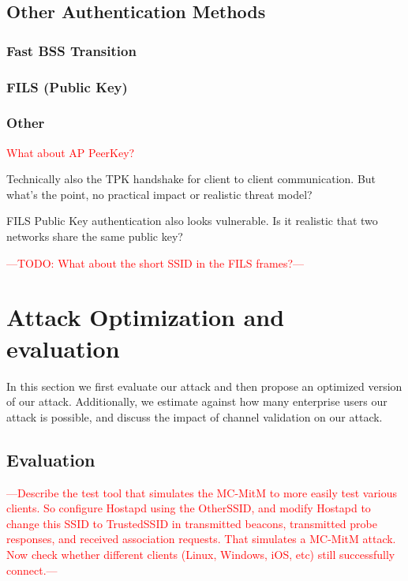 \documentclass[sigconf,review,anonymous]{acmart}
\DeclareRobustCommand{\red}[1]{\textcolor{red}{#1}}
\begin{document}
\subsection{Other Authentication Methods}

\subsubsection{Fast BSS Transition}

\subsubsection{FILS (Public Key)}

\subsubsection{Other}

\red{What about AP PeerKey?}

Technically also the TPK handshake for client to client communication.
But what's the point, no practical impact or realistic threat model?

FILS Public Key authentication also looks vulnerable.
Is it realistic that two networks share the same public key?

\red{---TODO: What about the short SSID in the FILS frames?---}

\section{Attack Optimization and evaluation}
\label{sec:evaluation}

In this section we first evaluate our attack and then propose an optimized version of our attack.
Additionally, we estimate against how many enterprise users our attack is possible, and discuss the impact of channel validation on our attack.

\subsection{Evaluation}



\red{---Describe the test tool that simulates the MC-MitM to more easily test various clients. So configure Hostapd using the OtherSSID, and modify Hostapd to change this SSID to TrustedSSID in transmitted beacons, transmitted probe responses, and received association requests. That simulates a MC-MitM attack. Now check whether different clients (Linux, Windows, iOS, etc) still successfully connect.---}
\end{document}
